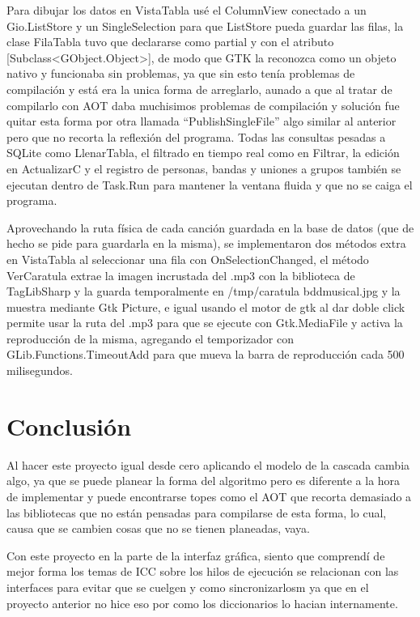 \documentclass[12pt,letterpaper]{article}
\begin{document}
Para dibujar los datos en VistaTabla usé el ColumnView conectado a un Gio.ListStore y un SingleSelection para que ListStore pueda guardar las filas, la clase FilaTabla tuvo que declararse como partial y con el atributo [Subclass<GObject.Object>], de modo que GTK la reconozca como un objeto nativo y funcionaba sin problemas, ya que sin esto tenía problemas de compilación y está era la unica forma de arreglarlo, aunado a que al tratar de compilarlo con AOT daba muchisimos problemas de compilación y solución fue quitar esta forma por otra llamada ``PublishSingleFile'' algo similar al anterior pero que no recorta la reflexión del programa. Todas las consultas pesadas a SQLite como LlenarTabla, el filtrado en tiempo real como en Filtrar, la edición en ActualizarC y el registro de personas, bandas y uniones a grupos también se ejecutan dentro de Task.Run para mantener la ventana fluida y que no se caiga el programa.

Aprovechando la ruta física de cada canción guardada en la base de datos (que de hecho se pide para guardarla en la misma), se implementaron dos métodos extra en VistaTabla al seleccionar una fila con OnSelectionChanged, el método VerCaratula extrae la imagen incrustada del .mp3 con la biblioteca de TagLibSharp y la guarda temporalmente en /tmp/caratula bddmusical.jpg y la muestra mediante Gtk Picture, e igual usando el motor de gtk al dar doble click permite usar la ruta del .mp3 para que se ejecute con Gtk.MediaFile y activa la reproducción de la misma, agregando el temporizador con GLib.Functions.TimeoutAdd para que mueva la barra de reproducción cada 500 milisegundos.

\newpage
\section{Conclusión}
Al hacer este proyecto igual desde cero aplicando el modelo de la cascada cambia algo, ya que se puede planear la forma del algoritmo pero es diferente a la hora de implementar y puede encontrarse topes como el AOT que recorta demasiado a las bibliotecas que no están pensadas para compilarse de esta forma, lo cual, causa que se cambien cosas que no se tienen planeadas, vaya.

Con este proyecto en la parte de la interfaz gráfica, siento que comprendí de mejor forma los temas de ICC sobre los hilos de ejecución se relacionan con las interfaces para evitar que se cuelgen y como sincronizarlosm ya que en el proyecto anterior no hice eso por como los diccionarios lo hacian internamente.
\end{document}
